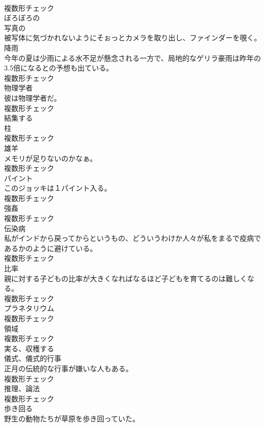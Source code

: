 \documentclass[8pt]{extreport}
\begin{document}
\begin{CJK}{UTF8}{min}
\\	複数形チェック
\\	[形容詞]	ぼろぼろの	
\\	[形容詞]	写真の	
\\	被写体に気づかれないようにそぉっとカメラを取り出し、ファインダーを覗く。	
\\	[名詞]	降雨	
\\	今年の夏は少雨による水不足が懸念される一方で、局地的なゲリラ豪雨は昨年の3.5倍になるとの予想も出ている。	
\\	複数形チェック
\\	[名詞]	物理学者	
\\	彼は物理学者だ。	
\\	複数形チェック
\\	[動詞]	結集する	
\\	[名詞]	柱	
\\	複数形チェック
\\	[名詞]	雄羊	
\\	メモリが足りないのかなぁ。	
\\	複数形チェック
\\	[名詞]	パイント	
\\	このジョッキは１パイント入る。	
\\	複数形チェック
\\	[名詞]	強姦	
\\	複数形チェック
\\	[名詞]	伝染病	
\\	私がインドから戻ってからというもの、どういうわけか人々が私をまるで疫病であるかのように避けている。	
\\	複数形チェック
\\	[名詞]	比率	
\\	親に対する子どもの比率が大きくなればなるほど子どもを育てるのは難しくなる。	
\\	複数形チェック
\\	[名詞]	プラネタリウム	
\\	複数形チェック
\\	[名詞]	領域	
\\	複数形チェック
\\	[動詞]	実る、収穫する	
\\	[名詞]	儀式、儀式的行事	
\\	正月の伝統的な行事が嫌いな人もある。	
\\	複数形チェック
\\	[名詞]	推理、論法	
\\	複数形チェック
\\	[動詞]	歩き回る	
\\	野生の動物たちが草原を歩き回っていた。	

\end{CJK}
\end{document}
